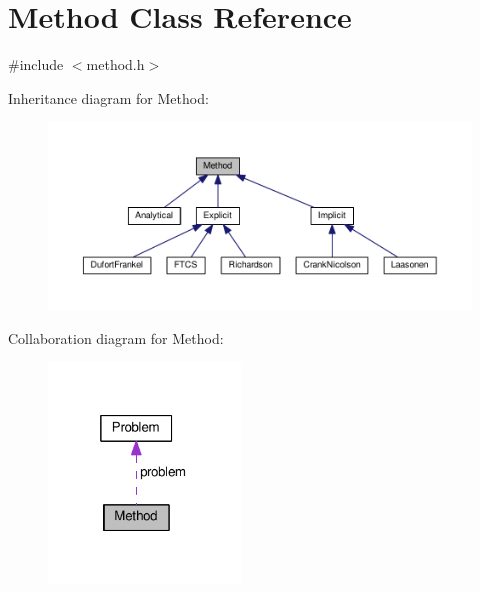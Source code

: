 \hypertarget{classMethod}{}\section{Method Class Reference}
\label{classMethod}


{\ttfamily \#include $<$method.\+h$>$}



Inheritance diagram for Method\+:
\nopagebreak
\begin{figure}[H]
\begin{center}
\leavevmode
\includegraphics[width=350pt]{classMethod__inherit__graph}
\end{center}
\end{figure}


Collaboration diagram for Method\+:
\nopagebreak
\begin{figure}[H]
\begin{center}
\leavevmode
\includegraphics[width=145pt]{classMethod__coll__graph}
\end{center}
\end{figure}

